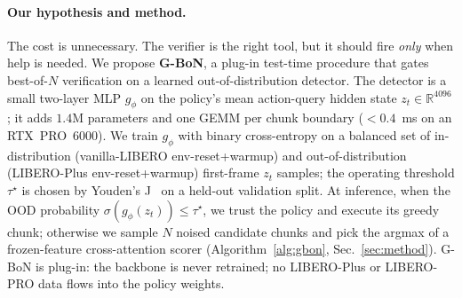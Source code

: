 \documentclass{article}
\begin{document}
\paragraph{Our hypothesis and method.}
The cost is unnecessary. The verifier is the right tool, but it should
fire \emph{only} when help is needed. We propose
\textbf{G-BoN}, a plug-in test-time procedure that gates best-of-$N$
verification on a learned out-of-distribution detector. The detector is
a small two-layer MLP $g_\phi$ on the policy's mean action-query hidden
state $z_t \in \mathbb{R}^{4096}$; it adds $1.4$M parameters and one
GEMM per chunk boundary ($<0.4$~ms on an RTX~PRO~6000). We train $g_\phi$
with binary cross-entropy on a balanced set of in-distribution
(vanilla-LIBERO env-reset+warmup) and out-of-distribution (LIBERO-Plus
env-reset+warmup) first-frame $z_t$ samples; the operating threshold
$\tau^\star$ is chosen by Youden's J~\citep{youden1950} on a held-out
validation split. At inference, when the OOD probability
$\sigma(g_\phi(z_t)) \leq \tau^\star$, we trust the policy and execute
its greedy chunk; otherwise we sample $N$ noised candidate chunks and
pick the argmax of a frozen-feature cross-attention scorer
(Algorithm~\ref{alg:gbon}, Sec.~\ref{sec:method}). G-BoN is plug-in:
the backbone is never retrained; no LIBERO-Plus or LIBERO-PRO data
flows into the policy weights.
\end{document}
